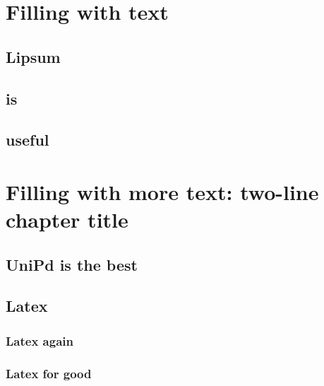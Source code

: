
\chapter{Filling with text}\label{ch:filling}

\lipsum[1-4]

\section{Lipsum}
\lipsum[5-7]

\section{is}
\lipsum[8-10]

\section{useful}
\lipsum[11-14]



\chapter{Filling with more text: two-line chapter title}\label{ch:filling-more}

\lipsum[15-16]

\section{UniPd is the best}
\lipsum[19-21]

\section{Latex}
\lipsum[28-30]

\subsection{Latex again}
\lipsum[30-31]

\subsection{Latex for good}
\lipsum[32-33]